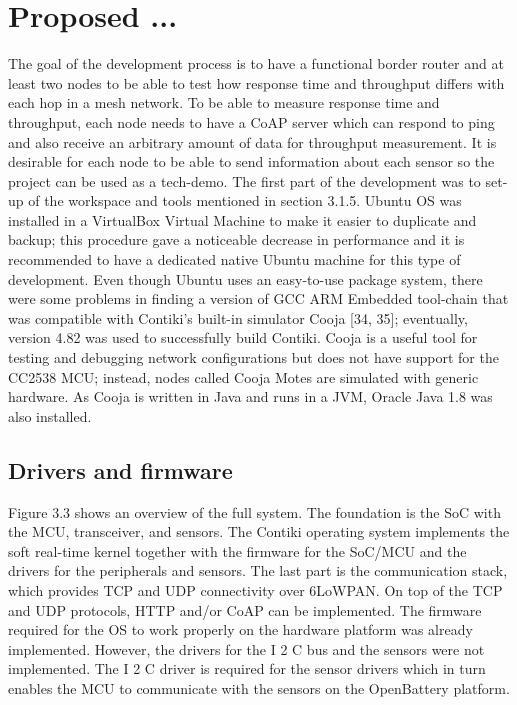 \section{Proposed ...} \label{sec:Approach}

The goal of the development process is to have a functional border router and at least two nodes to be able to test how response time and throughput differs with each hop in a mesh network.
To be able to measure response time and throughput,
	each node needs to have a CoAP server which can respond to ping and also receive an arbitrary amount of data for throughput measurement.
It is desirable for each node to be able to send information about each sensor so the project can be used as a tech-demo.
The first part of the development was to set-up of the workspace and tools mentioned in section 3.1.5.
Ubuntu OS was installed in a VirtualBox Virtual Machine to make it easier to duplicate and backup;
	this procedure gave a noticeable decrease in performance and it is recommended to have a dedicated native Ubuntu machine for this type of development.
Even though Ubuntu uses an easy-to-use package system,
	there were some problems in finding a version of GCC ARM Embedded tool-chain that was compatible with Contiki’s built-in simulator Cooja [34, 35];
	eventually,
	version 4.82 was used to successfully build Contiki.
Cooja is a useful tool for testing and debugging network configurations but does not have support for the CC2538 MCU;
	instead,
	nodes called Cooja Motes are simulated with generic hardware.
As Cooja is written in Java and runs in a JVM,
	Oracle Java 1.8 was also installed.
	
\subsection{Drivers and firmware}

Figure 3.3 shows an overview of the full system.
The foundation is the SoC with the MCU,
	transceiver,
	and sensors.
The Contiki operating system implements the soft real-time kernel together with the firmware for the SoC/MCU and the drivers for the peripherals and sensors.
The last part is the communication stack,
	which provides TCP and UDP connectivity over 6LoWPAN.
On top of the TCP and UDP protocols,
	HTTP and/or CoAP can be implemented.
The firmware required for the OS to work properly on the hardware platform was already implemented.
However,
	the drivers for the I 2 C bus and the sensors were not implemented.
The I 2 C driver is required for the sensor drivers which in turn enables the MCU to communicate with the sensors on the OpenBattery platform.

